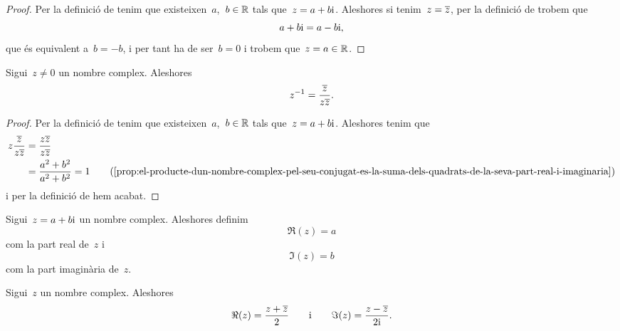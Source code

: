 \documentclass[../../main.tex]{subfiles}
\begin{document}
    \begin{proof}
        Per la definició de  tenim que
        existeixen~\(a\),~\(b\in\mathbb{R}\) tals que~\(z = a+b\mathrm{i}\).
        Aleshores si tenim~\(z = \overline{z}\), per la definició
        de  trobem que
        \[
            a+b\mathrm{i} = a-b\mathrm{i},
        \]
        que és equivalent a~\(b = -b\), i per tant ha de ser~\(b = 0\) i
        trobem que~\(z = a\in\mathbb{R}\).
    \end{proof}
    \begin{proposition}
        \label{prop:inversa-dun-nombre-complex-en-funcio-del-seu-conjugat}
        Sigui~\(z \neq 0\) un nombre complex.
        Aleshores
        \[
            z^{-1} = \frac{\overline{z}}{z\overline{z}}.
        \]
    \end{proposition}
    \begin{proof}
        Per la definició de  tenim que
        existeixen~\(a\),~\(b\in\mathbb{R}\) tals que~\(z = a+b\mathrm{i}\).
        Aleshores tenim que
        \begin{align*}
            z\frac{\conjugat{z}}{z\conjugat{z}}
                &= \frac{z\conjugat{z}}{z\conjugat{z}} \\
                &= \frac{a^{2}+b^{2}}{a^{2}+b^{2}} = 1
                \tag{\ref{prop:el-producte-dun-nombre-complex-pel-seu-conjugat-es-la-suma-dels-quadrats-de-la-seva-part-real-i-imaginaria}}
        \end{align*}
        i per la definició de 
        hem acabat.
    \end{proof}
    \begin{definition}
        \label{def:part-real-i-part-imaginaria-dun-nombre-complex}
        \label{def:part-real-dun-nombre-complex}
        \label{def:part-imaginaria-dun-nombre-complex}
        Sigui~\(z = a+b\mathrm{i}\) un nombre complex.
        Aleshores definim
        \[
            \Re(z) = a
        \]
        com la part real de~\(z\) i
        \[
            \Im(z) = b
        \]
        com la part imaginària de~\(z\).
    \end{definition}
    \begin{proposition}
        \label{prop:formules-per-la-part-real-i-part-imaginaria-dun-nombre-complex}
        \label{prop:formula-per-la-part-real-dun-nombre-complex}
        \label{prop:formula-per-la-part-imaginaria-dun-nombre-complex}
        Sigui~\(z\) un nombre complex.
        Aleshores
        \[
            \Re(z) = \frac{z+\overline{z}}{2}\qquad\text{i}\qquad\Im(z)
                   = \frac{z-\overline{z}}{2\mathrm{i}}.
        \]
    \end{proposition}
\end{document}
